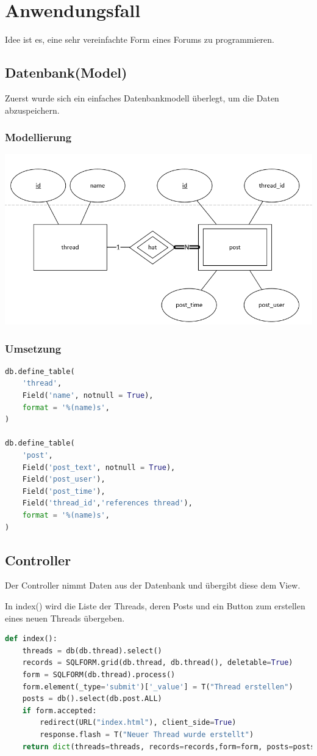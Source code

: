 \section{Anwendungsfall}
Idee ist es, eine sehr vereinfachte Form eines Forums zu programmieren. 

\subsection{Datenbank(Model)}
Zuerst wurde sich ein einfaches Datenbankmodell überlegt, um die Daten abzuspeichern.
\subsubsection{Modellierung}
\begin{minipage}{\linewidth}
	\centering
	\includegraphics[width=0.8\linewidth]{images/diagram}
\end{minipage}

\subsubsection{Umsetzung}
\begin{lstlisting}[language=python]
db.define_table(
	'thread',
	Field('name', notnull = True),
	format = '%(name)s',
)
	
db.define_table(
	'post',
	Field('post_text', notnull = True),
	Field('post_user'),
	Field('post_time'),
	Field('thread_id','references thread'),
	format = '%(name)s',
)
\end{lstlisting}

\subsection{Controller}
Der Controller nimmt Daten aus der Datenbank und übergibt diese dem View.

In index() wird die Liste der Threads, deren Posts und ein Button zum erstellen eines neuen Threads übergeben.
\begin{lstlisting}[language=python]
def index():
    threads = db(db.thread).select()
    records = SQLFORM.grid(db.thread, db.thread(), deletable=True)
    form = SQLFORM(db.thread).process()
    form.element(_type='submit')['_value'] = T("Thread erstellen")
    posts = db().select(db.post.ALL)
    if form.accepted:
        redirect(URL("index.html"), client_side=True)
        response.flash = T("Neuer Thread wurde erstellt")
    return dict(threads=threads, records=records,form=form, posts=posts)
\end{lstlisting}

